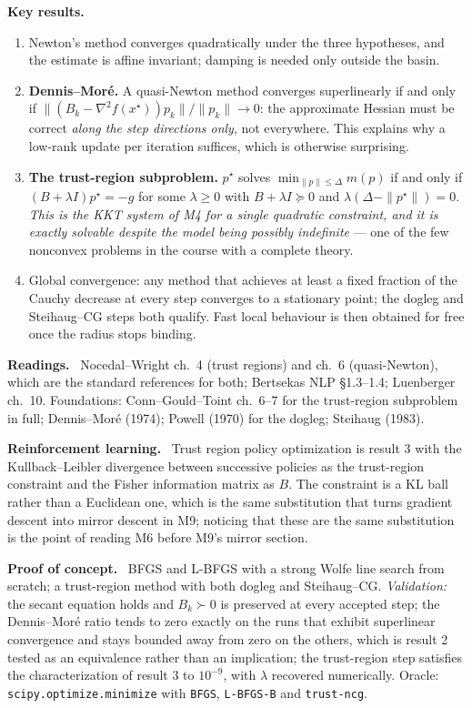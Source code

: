 \documentclass[11pt,a4paper]{article}
\newcommand{\mpart}[1]{\smallskip\noindent\textbf{#1}\ \ignorespaces}
\begin{document}
\mpart{Key results.}
\begin{enumerate}
\item Newton's method converges quadratically under the three hypotheses, and the estimate is
affine invariant; damping is needed only outside the basin.
\item \textbf{Dennis--Mor\'e.} A quasi-Newton method converges superlinearly if and only if
$\|(B_k-\nabla^2 f(x^\star))p_k\|/\|p_k\| \to 0$: the approximate Hessian must be correct
\emph{along the step directions only}, not everywhere. This explains why a low-rank update per
iteration suffices, which is otherwise surprising.
\item \textbf{The trust-region subproblem.} $p^\star$ solves
$\min_{\|p\|\le\Delta} m(p)$ if and only if $(B+\lambda I)p^\star=-g$ for some $\lambda \ge 0$
with $B+\lambda I \succeq 0$ and $\lambda(\Delta-\|p^\star\|)=0$. \emph{This is the KKT system
of M4 for a single quadratic constraint, and it is exactly solvable despite the model being
possibly indefinite} --- one of the few nonconvex problems in the course with a complete
theory.
\item Global convergence: any method that achieves at least a fixed fraction of the Cauchy
decrease at every step converges to a stationary point; the dogleg and Steihaug--CG steps both
qualify. Fast local behaviour is then obtained for free once the radius stops binding.
\end{enumerate}

\mpart{Readings.} Nocedal--Wright ch.~4 (trust regions) and ch.~6 (quasi-Newton), which are
the standard references for both; Bertsekas NLP \S 1.3--1.4; Luenberger ch.~10. Foundations:
Conn--Gould--Toint ch.~6--7 for the trust-region subproblem in full; Dennis--Mor\'e (1974);
Powell (1970) for the dogleg; Steihaug (1983).

\mpart{Reinforcement learning.} Trust region policy optimization is result 3 with the
Kullback--Leibler divergence between successive policies as the trust-region constraint and
the Fisher information matrix as $B$. The constraint is a KL ball rather than a Euclidean one,
which is the same substitution that turns gradient descent into mirror descent in M9; noticing
that these are the same substitution is the point of reading M6 before M9's mirror section.

\mpart{Proof of concept.} BFGS and L-BFGS with a strong Wolfe line search from scratch; a
trust-region method with both dogleg and Steihaug--CG. \emph{Validation:} the secant equation
holds and $B_k \succ 0$ is preserved at every accepted step; the Dennis--Mor\'e ratio tends to
zero exactly on the runs that exhibit superlinear convergence and stays bounded away from zero
on the others, which is result 2 tested as an equivalence rather than an implication; the
trust-region step satisfies the characterization of result 3 to $10^{-9}$, with $\lambda$
recovered numerically. Oracle: \texttt{scipy.optimize.minimize} with \texttt{BFGS},
\texttt{L-BFGS-B} and \texttt{trust-ncg}.
\end{document}
